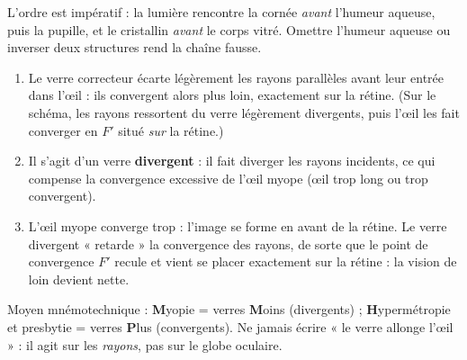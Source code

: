 \documentclass[11pt]{article}
\begin{document}
\begin{attention}
L'ordre est impératif : la lumière rencontre la cornée \emph{avant} l'humeur aqueuse, puis la pupille, et le cristallin \emph{avant} le corps vitré. Omettre l'humeur aqueuse ou inverser deux structures rend la chaîne fausse.
\end{attention}

\begin{corrige}
\begin{enumerate}
\item Le verre correcteur écarte légèrement les rayons parallèles avant leur entrée dans l'œil : ils convergent alors plus loin, exactement sur la rétine. (Sur le schéma, les rayons ressortent du verre légèrement divergents, puis l'œil les fait converger en $F'$ situé \emph{sur} la rétine.)
\item Il s'agit d'un verre \textbf{divergent} : il fait diverger les rayons incidents, ce qui compense la convergence excessive de l'œil myope (œil trop long ou trop convergent).
\item L'œil myope converge trop : l'image se forme en avant de la rétine. Le verre divergent « retarde » la convergence des rayons, de sorte que le point de convergence $F'$ recule et vient se placer exactement sur la rétine : la vision de loin devient nette.
\end{enumerate}
\end{corrige}

\begin{attention}
Moyen mnémotechnique : \textbf{M}yopie = verres \textbf{M}oins (divergents) ; \textbf{H}ypermétropie et presbytie = verres \textbf{P}lus (convergents). Ne jamais écrire « le verre allonge l'œil » : il agit sur les \emph{rayons}, pas sur le globe oculaire.
\end{attention}
\end{document}
